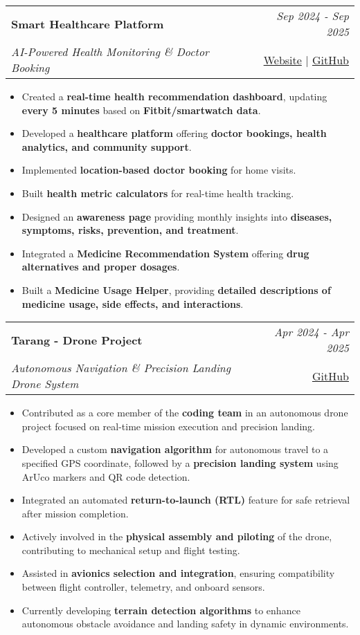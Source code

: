 \documentclass[a4paper,11pt]{article}
\makeatletter
\newcommand{\resumeProject}[4]{
\vspace{0.5mm}\item
    \begin{tabular*}{0.98\textwidth}[t]{l@{\extracolsep{\fill}}r}
        \textbf{#1} & \textit{\footnotesize{#3}} \\
        \footnotesize{\textit{#2}} & \footnotesize{#4}
    \end{tabular*}
    \vspace{-2.4mm}
}
\newcommand{\resumeItemListStart}{\begin{itemize}[leftmargin=*,labelsep=1mm,itemsep=0.5mm]}
\newcommand{\resumeItemListEnd}{\end{itemize}\vspace{-2mm}}
\makeatother
\begin{document}
\resumeProject
    {Smart Healthcare Platform}
    {AI-Powered Health Monitoring \& Doctor Booking}
    {Sep 2024 - Sep 2025}
    {{}\href{https://pulse360.highintoxic.tech/}{Website} | \href{https://github.com/THE-DEEPDAS/Pulse-360}{GitHub}}
\resumeItemListStart
     \item Created a \textbf{real-time health recommendation dashboard}, updating \textbf{every 5 minutes} based on \textbf{Fitbit/smartwatch data}.
    \item Developed a \textbf{healthcare platform} offering \textbf{doctor bookings, health analytics, and community support}.
    \item Implemented \textbf{location-based doctor booking} for home visits.
    \item Built \textbf{health metric calculators} for real-time health tracking.
    \item Designed an \textbf{awareness page} providing monthly insights into \textbf{diseases, symptoms, risks, prevention, and treatment}.
    \item Integrated a \textbf{Medicine Recommendation System} offering \textbf{drug alternatives and proper dosages}.
    \item Built a \textbf{Medicine Usage Helper}, providing \textbf{detailed descriptions of medicine usage, side effects, and interactions}.
   
\resumeItemListEnd

\resumeProject
    {Tarang - Drone Project}
    {Autonomous Navigation \& Precision Landing Drone System}
    {Apr 2024 - Apr 2025}
    {\href{https://github.com/THE-DEEPDAS/Phoenix-Aero-2024-25-Drone-Project}{GitHub}}

\resumeItemListStart
    \item Contributed as a core member of the \textbf{coding team} in an autonomous drone project focused on real-time mission execution and precision landing.
    \item Developed a custom \textbf{navigation algorithm} for autonomous travel to a specified GPS coordinate, followed by a \textbf{precision landing system} using ArUco markers and QR code detection.
    \item Integrated an automated \textbf{return-to-launch (RTL)} feature for safe retrieval after mission completion.
    \item Actively involved in the \textbf{physical assembly and piloting} of the drone, contributing to mechanical setup and flight testing.
    \item Assisted in \textbf{avionics selection and integration}, ensuring compatibility between flight controller, telemetry, and onboard sensors.
    \item Currently developing \textbf{terrain detection algorithms} to enhance autonomous obstacle avoidance and landing safety in dynamic environments.
\resumeItemListEnd
\end{document}
